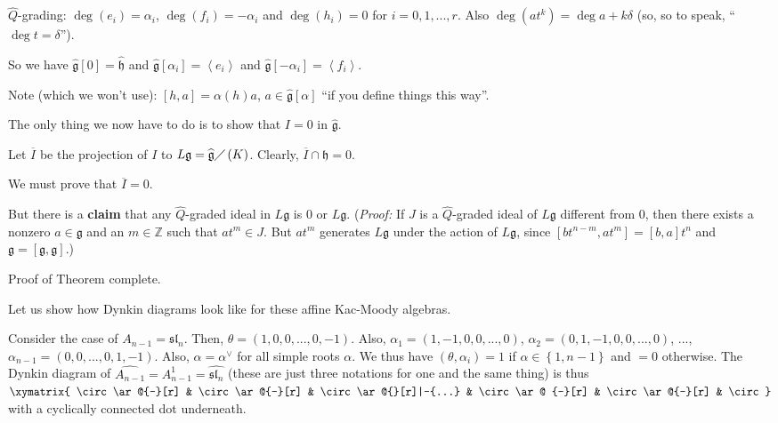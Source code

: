 \documentclass[etingof-lie.tex]{subfiles}
\begin{document}
$\widehat{Q}$-grading: $\deg\left(  e_{i}\right)  =\alpha_{i}$, $\deg\left(
f_{i}\right)  =-\alpha_{i}$ and $\deg\left(  h_{i}\right)  =0$ for
$i=0,1,...,r$. Also $\deg\left(  at^{k}\right)  =\deg a+k\delta$ (so, so to
speak, ``$\deg t=\delta$'').

So we have $\widehat{\mathfrak{g}}\left[  0\right]  =\widehat{\mathfrak{h}}$
and $\widehat{\mathfrak{g}}\left[  \alpha_{i}\right]  =\left\langle
e_{i}\right\rangle $ and $\widehat{\mathfrak{g}}\left[  -\alpha_{i}\right]
=\left\langle f_{i}\right\rangle $.

Note (which we won't use): $\left[  h,a\right]  =\alpha\left(  h\right)  a$,
$a\in\widehat{\mathfrak{g}}\left[  \alpha\right]  $ ``if you define things
this way''.

The only thing we now have to do is to show that $I=0$ in
$\widehat{\mathfrak{g}}$.

Let $\overline{I}$ be the projection of $I$ to $L\mathfrak{g}%
=\widehat{\mathfrak{g}}\diagup\left(  K\right)  $. Clearly, $\overline{I}%
\cap\mathfrak{h}=0$.

We must prove that $\overline{I}=0$.

But there is a \textbf{claim} that any $\widehat{Q}$-graded ideal in
$L\mathfrak{g}$ is $0$ or $L\mathfrak{g}$. (\textit{Proof:} If $J$ is a
$\widehat{Q}$-graded ideal of $L\mathfrak{g}$ different from $0$, then there
exists a nonzero $a\in\mathfrak{g}$ and an $m\in\mathbb{Z}$ such that
$at^{m}\in J$. But $at^{m}$ generates $L\mathfrak{g}$ under the action of
$L\mathfrak{g}$, since $\left[  bt^{n-m},at^{m}\right]  =\left[  b,a\right]
t^{n}$ and $\mathfrak{g}=\left[  \mathfrak{g},\mathfrak{g}\right]  $.)

Proof of Theorem complete.

Let us show how Dynkin diagrams look like for these affine Kac-Moody algebras.

Consider the case of $A_{n-1}=\mathfrak{sl}_{n}$. Then, $\theta=\left(
1,0,0,...,0,-1\right)  $. Also, $\alpha_{1}=\left(  1,-1,0,0,...,0\right)  $,
$\alpha_{2}=\left(  0,1,-1,0,0,...,0\right)  $, $...$, $\alpha_{n-1}=\left(
0,0,...,0,1,-1\right)  $. Also, $\alpha=\alpha^{\vee}$ for all simple roots
$\alpha$. We thus have $\left(  \theta,\alpha_{i}\right)  =1$ if $\alpha
\in\left\{  1,n-1\right\}  $ and $=0$ otherwise. The Dynkin diagram of
$\widehat{A_{n-1}}=A_{n-1}^{1}=\widehat{\mathfrak{sl}_{n}}$ (these are just
three notations for one and the same thing) is thus $%
\xymatrix{
\circ\ar@{-}[r] & \circ\ar@{-}[r] & \circ\ar@{}[r]|-{...} & \circ\ar@
{-}[r] & \circ\ar@{-}[r] & \circ}%
$ with a cyclically connected dot underneath.
\end{document}
